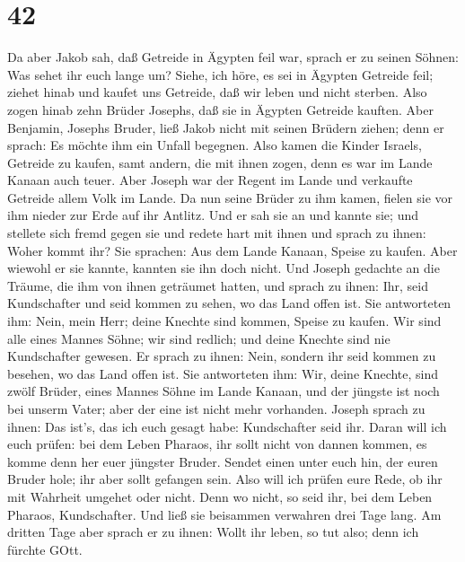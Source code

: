\hypertarget{section-41}{%
\section{42}\label{section-41}}

 Da aber Jakob sah, daß Getreide in Ägypten feil war, sprach
er zu seinen Söhnen: Was sehet ihr euch lange um?  Siehe,
ich höre, es sei in Ägypten Getreide feil; ziehet hinab und kaufet uns
Getreide, daß wir leben und nicht sterben.  Also zogen hinab
zehn Brüder Josephs, daß sie in Ägypten Getreide kauften. 
Aber Benjamin, Josephs Bruder, ließ Jakob nicht mit seinen Brüdern
ziehen; denn er sprach: Es möchte ihm ein Unfall begegnen. 
Also kamen die Kinder Israels, Getreide zu kaufen, samt andern, die mit
ihnen zogen, denn es war im Lande Kanaan auch teuer.  Aber
Joseph war der Regent im Lande und verkaufte Getreide allem Volk im
Lande. Da nun seine Brüder zu ihm kamen, fielen sie vor ihm nieder zur
Erde auf ihr Antlitz.  Und er sah sie an und kannte sie; und
stellete sich fremd gegen sie und redete hart mit ihnen und sprach zu
ihnen: Woher kommt ihr? Sie sprachen: Aus dem Lande Kanaan, Speise zu
kaufen.  Aber wiewohl er sie kannte, kannten sie ihn doch
nicht.  Und Joseph gedachte an die Träume, die ihm von ihnen
geträumet hatten, und sprach zu ihnen: Ihr, seid Kundschafter und seid
kommen zu sehen, wo das Land offen ist.  Sie antworteten
ihm: Nein, mein Herr; deine Knechte sind kommen, Speise zu kaufen.
 Wir sind alle eines Mannes Söhne; wir sind redlich; und
deine Knechte sind nie Kundschafter gewesen.  Er sprach zu
ihnen: Nein, sondern ihr seid kommen zu besehen, wo das Land offen ist.
 Sie antworteten ihm: Wir, deine Knechte, sind zwölf
Brüder, eines Mannes Söhne im Lande Kanaan, und der jüngste ist noch bei
unserm Vater; aber der eine ist nicht mehr vorhanden. 
Joseph sprach zu ihnen: Das ist's, das ich euch gesagt habe:
Kundschafter seid ihr.  Daran will ich euch prüfen: bei dem
Leben Pharaos, ihr sollt nicht von dannen kommen, es komme denn her euer
jüngster Bruder.  Sendet einen unter euch hin, der euren
Bruder hole; ihr aber sollt gefangen sein. Also will ich prüfen eure
Rede, ob ihr mit Wahrheit umgehet oder nicht. Denn wo nicht, so seid
ihr, bei dem Leben Pharaos, Kundschafter.  Und ließ sie
beisammen verwahren drei Tage lang.  Am dritten Tage aber
sprach er zu ihnen: Wollt ihr leben, so tut also; denn ich fürchte GOtt.
